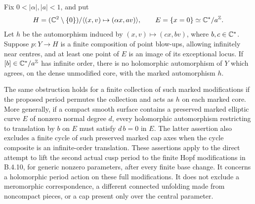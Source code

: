 \begin{proposition}
Fix $0<|\alpha|,|a|<1$, and put
\[
 H=(\mathbb C^2\setminus\{0\})/
       \langle(x,v)\mapsto(\alpha x,av)\rangle,
       \qquad E=\{x=0\}\simeq\mathbb C^*/a^\mathbb Z.
\]
Let $h$ be the automorphism induced by
$(x,v)\mapsto(c x,bv)$, where $b,c\in\mathbb C^*$.
Suppose $p:Y\to H$ is a finite composition of point blow-ups,
allowing infinitely near centres, and at least one point of $E$
is an image of its exceptional locus. If $[b]\in\mathbb C^*/a^\mathbb Z$ has
infinite order, there is no holomorphic automorphism of $Y$
which agrees, on the dense unmodified core, with the marked
automorphism $h$.

The same obstruction holds for a finite collection of such marked
modifications if the proposed period permutes the collection and
acts as $h$ on each marked core.
More generally, if a compact smooth surface contains a preserved
marked elliptic curve $E$ of nonzero normal degree $d$, every
holomorphic automorphism restricting to translation by $b$ on $E$
must satisfy $d\,b=0$ in $E$.
The latter assertion also excludes a finite cycle of such preserved
marked cap axes when the cycle composite is an infinite-order
translation. These assertions apply to the direct attempt
to lift the second actual cusp period to the finite Hopf
modifications in B.4.10, for generic nonzero parameters, after every
finite base change. It concerns a holomorphic period action on
these full modifications. It does not exclude a meromorphic
correspondence, a different connected unfolding made from
noncompact pieces, or a cap present only over the central parameter.
\end{proposition}
